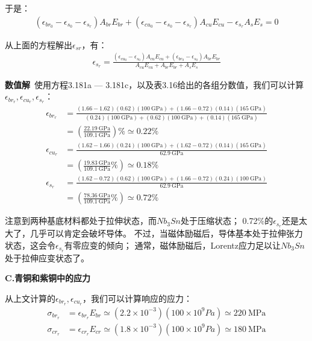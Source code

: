 于是：
\begin{align*}
(\epsilon_{br_0}-\epsilon_{s_0}-\epsilon_{s_r})A_{br}E_{br}+(\epsilon_{cu_0}-\epsilon_{s_0}-\epsilon_{s_r})A_{cu}E_{cu}-\epsilon_{s_r}A_sE_s=0
\end{align*}

从上面的方程解出$\epsilon_{sr}$，有：
\begin{align*}%
\epsilon_{s_r}=\frac{(\epsilon_{cu_0}-\epsilon_{s_0})A_{cu}E_{cu}+(\epsilon_{br_0}-\epsilon_{s_0})A_{br}E_{br}}{A_{cu}E_{cu}+A_{br}E_{br}+A_{s}E_{s}}\tag{3.181c}
\end{align*}

\textbf{数值解}\ 使用方程3.181a — 3.181c，以及表3.16给出的各组分数值，我们可以计算
$\epsilon_{br_r},\epsilon_{cu_r}, \epsilon_{s_r}$：
\begin{align*}%
\epsilon_{br_r}&=\frac{(1.66-1.62)(0.62)(100\ \mathrm{GPa})+(1.66-0.72)(0.14)(165\ \mathrm{GPa})}{(0.24)(100\ \mathrm{GPa})+(0.62)(100\ \mathrm{GPa})+(0.14)(165\ \mathrm{GPa})}\\
&=(\frac{22.19\ \mathrm{GPa}}{109.1\ \mathrm{GPa}})\% \simeq0.22\% \\
\epsilon_{cu_r}&=\frac{(1.62-1.66)(0.24)(100\ \mathrm{GPa})+(1.62-0.72)(0.14)(165\ \mathrm{GPa})}{62.9\ \mathrm{GPa}}\\
&=(\frac{19.83\ \mathrm{GPa}}{109.1\ \mathrm{GPa}}\%)\simeq0.18\% \\
\epsilon_{s_r}&=\frac{(1.62-0.72)(0.62)(100\ \mathrm{GPa})+(1.66-0.72)(0.24)(100\ \mathrm{GPa})}{62.9\ \mathrm{GPa}}\\
&=(\frac{78.36\ \mathrm{GPa}}{109.1\ \mathrm{GPa}}\%)\simeq0.72\% 
\end{align*}

注意到两种基底材料都处于拉伸状态，而$Nb_3Sn$处于压缩状态；
0.72\%的$\epsilon_{s_r}$还是太大了，几乎可以肯定会破坏导体。
不过，当磁体励磁后，导体基本处于拉伸张力状态，这会令$\epsilon_{s_r}$有零应变的倾向；
通常，磁体励磁后，Lorentz应力足以让$Nb_3Sn$处于拉伸应变状态了。

\textbf{C.青铜和紫铜中的应力}

从上文计算的$\epsilon_{br_r},\epsilon_{cu_r}$，我们可以计算响应的应力：
 \begin{align*}
\sigma_{br_r}&=\epsilon_{br_r}E_{br}\simeq(2.2\times10^{-3})(100\times10^9Pa)\simeq220\ \mathrm{MPa}\\
\sigma_{cr_r}&=\epsilon_{cr_r}E_{cr}\simeq(1.8\times10^{-3})(100\times10^9Pa)\simeq180\ \mathrm{MPa}
\end{align*}

